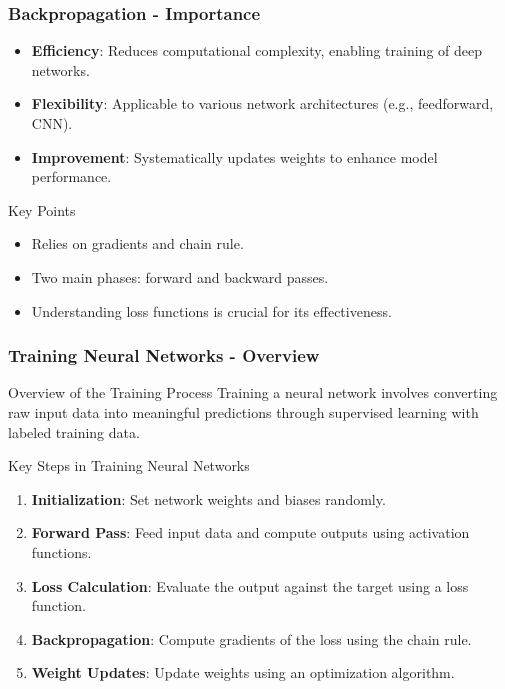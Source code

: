 \documentclass[aspectratio=169]{beamer}
\begin{document}
\begin{frame}[fragile]
  \frametitle{Backpropagation - Importance}
  \begin{itemize}
      \item \textbf{Efficiency}: Reduces computational complexity, enabling training of deep networks.
      \item \textbf{Flexibility}: Applicable to various network architectures (e.g., feedforward, CNN).
      \item \textbf{Improvement}: Systematically updates weights to enhance model performance.
  \end{itemize}
  
  \begin{block}{Key Points}
      \begin{itemize}
          \item Relies on gradients and chain rule.
          \item Two main phases: forward and backward passes.
          \item Understanding loss functions is crucial for its effectiveness.
      \end{itemize}
  \end{block}
\end{frame}

\begin{frame}[fragile]
    \frametitle{Training Neural Networks - Overview}
    \begin{block}{Overview of the Training Process}
        Training a neural network involves converting raw input data into meaningful predictions through supervised learning with labeled training data.
    \end{block}
    
    \begin{block}{Key Steps in Training Neural Networks}
        \begin{enumerate}
            \item \textbf{Initialization}: Set network weights and biases randomly.
            \item \textbf{Forward Pass}: Feed input data and compute outputs using activation functions.
            \item \textbf{Loss Calculation}: Evaluate the output against the target using a loss function.
            \item \textbf{Backpropagation}: Compute gradients of the loss using the chain rule.
            \item \textbf{Weight Updates}: Update weights using an optimization algorithm.
        \end{enumerate}
    \end{block}
\end{frame}
\end{document}
